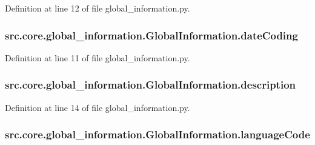 Definition at line 12 of file global\+\_\+information.\+py.

\hypertarget{classsrc_1_1core_1_1global__information_1_1_global_information_aaa8008762d8d3afa73ea17c110d3813b}{
\subsubsection[{date\+Coding}]{\setlength{\rightskip}{0pt plus 5cm}src.\+core.\+global\+\_\+information.\+Global\+Information.\+date\+Coding}}\label{classsrc_1_1core_1_1global__information_1_1_global_information_aaa8008762d8d3afa73ea17c110d3813b}


Definition at line 11 of file global\+\_\+information.\+py.

\hypertarget{classsrc_1_1core_1_1global__information_1_1_global_information_ad9432db5c5b0393589658eb92a17bce3}{
\subsubsection[{description}]{\setlength{\rightskip}{0pt plus 5cm}src.\+core.\+global\+\_\+information.\+Global\+Information.\+description}}\label{classsrc_1_1core_1_1global__information_1_1_global_information_ad9432db5c5b0393589658eb92a17bce3}


Definition at line 14 of file global\+\_\+information.\+py.

\hypertarget{classsrc_1_1core_1_1global__information_1_1_global_information_a67df050014c5e4f44cd0d34c5c97da3f}{
\subsubsection[{language\+Code}]{\setlength{\rightskip}{0pt plus 5cm}src.\+core.\+global\+\_\+information.\+Global\+Information.\+language\+Code}}\label{classsrc_1_1core_1_1global__information_1_1_global_information_a67df050014c5e4f44cd0d34c5c97da3f}


